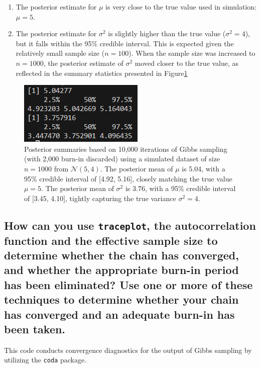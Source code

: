 \documentclass[]{article}
\begin{document}
\begin{enumerate}
	\item The posterior estimate for $\mu$ is very close to the true value used in simulation: $\mu = 5$.

	\item The posterior estimate for $\sigma^2$ is slightly higher than the true value ($\sigma^2 = 4$), but it falls within the 95\% credible interval. This is expected given the relatively small sample size ($n = 100$). When the sample size was increased to $n = 1000$, the posterior estimate of $\sigma^2$ moved closer to the true value, as reflected in the summary statistics presented in Figure\ref{fig:img-2-post-summary1}
\end{enumerate}

\begin{figure}[H]
	\centering
	\includegraphics[width=0.7\linewidth]{img/img-2-post-summary1}
	\caption{Posterior summaries based on 10,000 iterations of Gibbs sampling (with 2,000 burn-in discarded) using a simulated dataset of size $n = 1000$ from $\mathcal{N}(5, 4)$. The posterior mean of $\mu$ is 5.04, with a 95\% credible interval of [4.92, 5.16], closely matching the true value $\mu = 5$. The posterior mean of $\sigma^2$ is 3.76, with a 95\% credible interval of [3.45, 4.10], tightly capturing the true variance $\sigma^2 = 4$.}
	\label{fig:img-2-post-summary1}
\end{figure}




\subsection{How can you use \texttt{traceplot}, the autocorrelation function and the effective sample size to determine whether the chain has converged, and whether the appropriate burn-in period has been eliminated? Use one or more of these techniques to determine whether your chain has converged and an adequate burn-in has been taken.}	

This code conducts convergence diagnostics for the output of Gibbs sampling by utilizing the \texttt{coda} package.
\end{document}
